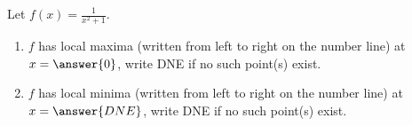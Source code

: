 \documentclass{ximera}
\author{Gregory Hartman \and Matthew Carr}
\begin{document}
\begin{exercise}






Let $f(x)=\frac{1}{x^2+1}$.
\begin{enumerate}
\item		$f$ has local maxima (written from left to right on the number line) at $x=\answer{0}$, write DNE if no such point(s) exist.
\item		$f$ has local minima (written from left to right on the number line) at $x=\answer{DNE}$, write DNE if no such point(s) exist.
\end{enumerate}

\end{exercise}
\end{document}
